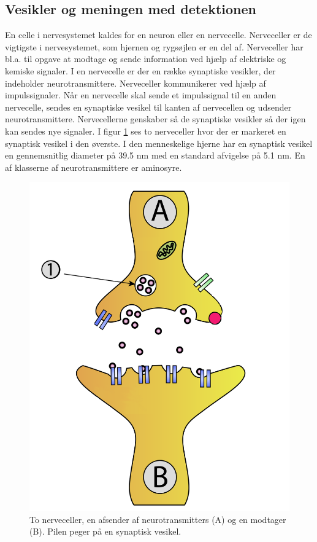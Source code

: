 \subsection{Vesikler og meningen med detektionen}
\pagestyle{headings}
En celle i nervesystemet kaldes for en neuron eller en nervecelle. Nerveceller er de vigtigste i nervesystemet, som hjernen og rygsøjlen er en del af.
Nerveceller har bl.a. til opgave at modtage og sende information ved hjælp af elektriske og kemiske signaler. I en nervecelle er der en række synaptiske vesikler, der indeholder neurotransmittere. Nerveceller kommunikerer ved hjælp af impulssignaler. Når en nervecelle skal sende et impulssignal til en anden nervecelle, sendes en synaptiske vesikel til kanten af nervecellen og udsender neurotransmittere. Nervecellerne genskaber så de synaptiske vesikler så der igen kan sendes nye signaler. I figur \ref{fig:intro_syntrans} ses to nerveceller hvor der er markeret en synaptisk vesikel i den øverste. I den menneskelige hjerne har en synaptisk vesikel en gennemsnitlig diameter på 39.5 nm med en standard afvigelse på 5.1 nm. En af klasserne af neurotransmittere er aminosyre.
\begin{figure}[H]
	\centering
	\includegraphics[scale=0.2]{files/intro/img/synTransmitter.png}
	\caption{To nerveceller, en afsender af neurotransmitters (A) og en modtager (B). Pilen peger på en synaptisk vesikel.\label{fig:intro_syntrans}\cite{neuron}}
\end{figure} 

